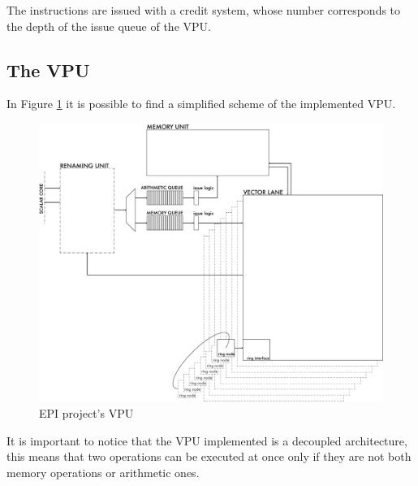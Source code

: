The instructions are issued with a credit system, whose number corresponds to the  depth of the issue queue of the VPU.



\subsection{The VPU}
In Figure \ref{VPU} it is possible to find a simplified scheme of the implemented VPU.

\begin{figure}[H]
    \centering
    \includegraphics[scale = 0.5]{Chapter_1/img/VPU.png}
    \caption{EPI project's VPU}
    \label{VPU}
\end{figure}
It is important to notice that the VPU implemented is a decoupled architecture, this means that two operations can be executed at once only if they are not both memory operations or arithmetic ones.


